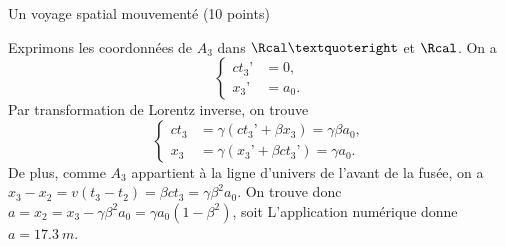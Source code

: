\begin{exo}[PC][1][devoir]{Un voyage spatial mouvementé (10 points)}
\begin{quest}
{    Exprimons les coordonnées de $A_3$ dans $\Rcal’$ et $\Rcal$. On a  
    $$
    \left\{
    \begin{aligned}
      ct_3’ &= 0, \\
      x_3’ &= a_0.
    \end{aligned}
    \right.
    $$
    Par transformation de Lorentz inverse, on trouve 
    $$
    \left\{
    \begin{aligned}
      ct_3 &= \gamma (ct_3’ + \beta x_3) = \gamma \beta a_0, \\
      x_3 &= \gamma(x_3’+\beta ct_3’) = \gamma a_0.
    \end{aligned}
    \right.
    $$
De plus, comme $A_3$ appartient à la ligne d’univers de l’avant de la fusée, on a $x_3-x_2 = v(t_3-t_2) = \beta c t_3 = \gamma \beta^2 a_0$. On trouve donc $a = x_2 = x_3 - \gamma \beta^2 a_0 = \gamma a_0(1-\beta^2)$, soit 
L’application numérique donne $a=\SI{17.3}{m}$.
    }
  \end{quest}
  
\end{exo}


